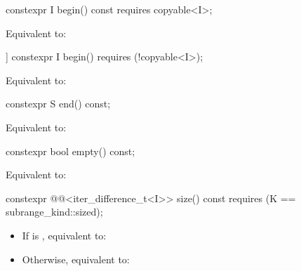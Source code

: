 %
\begin{itemdecl}
constexpr I begin() const requires copyable<I>;
\end{itemdecl}

\begin{itemdescr}
\pnum
\effects
Equivalent to: 
\end{itemdescr}

%
\begin{itemdecl}
[[nodiscard]] constexpr I begin() requires (!copyable<I>);
\end{itemdecl}

\begin{itemdescr}
\pnum
\effects
Equivalent to: 
\end{itemdescr}

%
\begin{itemdecl}
constexpr S end() const;
\end{itemdecl}

\begin{itemdescr}
\pnum
\effects
Equivalent to: 
\end{itemdescr}

%
\begin{itemdecl}
constexpr bool empty() const;
\end{itemdecl}

\begin{itemdescr}
\pnum
\effects
Equivalent to: 
\end{itemdescr}

%
\begin{itemdecl}
constexpr @@<iter_difference_t<I>> size() const
  requires (K == subrange_kind::sized);
\end{itemdecl}

\begin{itemdescr}
\pnum
\effects
\begin{itemize}
\item If  is , equivalent to: 
\item Otherwise, equivalent to: 
\end{itemize}
\end{itemdescr}

